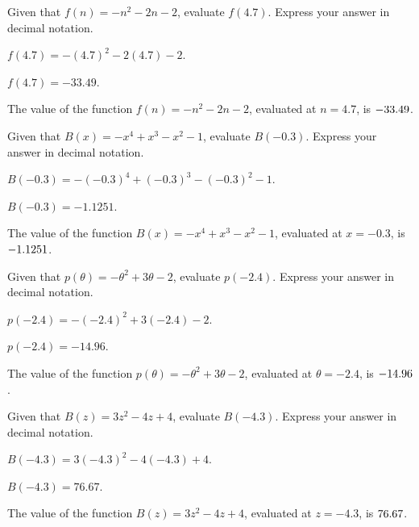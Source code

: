 \begin{shuffle}
\begin{exercise}
Given that $f(n)=-n^2-2 n-2$, evaluate $f(4.7)$. Express your answer in decimal notation.
\begin{solution}
\begin{hint}
$f(4.7)=-(4.7)^2-2 (4.7)-2$.
\end{hint}
\begin{hint}
$f(4.7)=-33.49$.
\end{hint}
The value of the function $f(n)=-n^2-2 n-2$, evaluated at $n=4.7$, is ${-33.49}$.
\end{solution}
\end{exercise}

\begin{exercise}
Given that $B(x)=-x^4+x^3-x^2-1$, evaluate $B(-0.3)$. Express your answer in decimal notation.
\begin{solution}
\begin{hint}
$B(-0.3)=-(-0.3)^4+(-0.3)^3-(-0.3)^2-1$.
\end{hint}
\begin{hint}
$B(-0.3)=-1.1251$.
\end{hint}
The value of the function $B(x)=-x^4+x^3-x^2-1$, evaluated at $x=-0.3$, is ${-1.1251}$.
\end{solution}
\end{exercise}

\begin{exercise}
Given that $p(\theta)=-\theta ^2+3 \theta -2$, evaluate $p(-2.4)$. Express your answer in decimal notation.
\begin{solution}
\begin{hint}
$p(-2.4)=-(-2.4) ^2+3 (-2.4) -2$.
\end{hint}
\begin{hint}
$p(-2.4)=-14.96$.
\end{hint}
The value of the function $p(\theta)=-\theta ^2+3 \theta -2$, evaluated at $\theta=-2.4$, is ${-14.96}$.
\end{solution}
\end{exercise}

\begin{exercise}
Given that $B(z)=3 z^2-4 z+4$, evaluate $B(-4.3)$. Express your answer in decimal notation.
\begin{solution}
\begin{hint}
$B(-4.3)=3 (-4.3)^2-4 (-4.3)+4$.
\end{hint}
\begin{hint}
$B(-4.3)=76.67$.
\end{hint}
The value of the function $B(z)=3 z^2-4 z+4$, evaluated at $z=-4.3$, is ${76.67}$.
\end{solution}
\end{exercise}


\end{shuffle}
